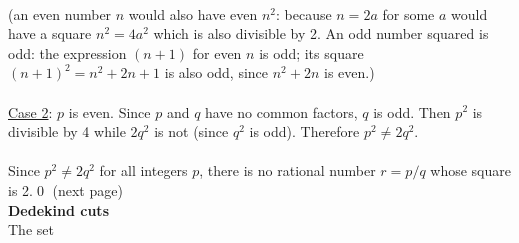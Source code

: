 \documentclass{report}
\begin{document}
\vspace{1mm}\\
(an even number $n$ would also have even $n^2$: because $n=2a$ for some $a$ would have a square $n^2=4a^2$ 
which is also divisible by 2. An odd number squared is odd: the expression $(n+1)$ for even $n$ 
is odd; its square $(n+1)^2=n^2+2n+1$ is also odd, since $n^2+2n$ is even.)\\
\vspace{1mm}\\
\underline{Case 2}: $p$ is even. Since $p$ and $q$ have no common factors, $q$ is odd. Then $p^2$ is divisible by 4
while $2q^2$ is not (since $q^2$ is odd). Therefore
$p^2\neq2q^2$.\\
\vspace{1mm}\\
Since $p^2\neq2q^2$ for all integers $p$, there is no rational number $r=p/q$ whose square is 2.\qed
(next page)\\
\noindent\textbf{Dedekind cuts}\\
The set
\end{document}
